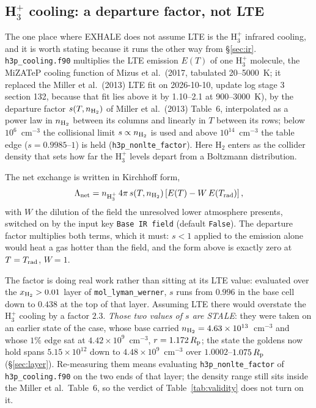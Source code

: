 \documentclass[english,a4paper]{my_memo}
\begin{document}
\subsection{H$_3^+$ cooling: a departure factor, not LTE}
\label{sec:h3p}

The one place where EXHALE does not assume LTE is the H$_3^+$ infrared
cooling, and it is worth stating because it runs the other way from
\S\ref{sec:ir}. \texttt{h3p\_cooling.f90} multiplies the LTE emission
$E(T)$ of one H$_3^+$ molecule, the MiZATeP cooling function of Mizus et al.\
(2017, tabulated 20--5000~K; it replaced the Miller et al.\ (2013) LTE fit on
2026-10-10, update log stage 3 section 132, because that fit lies above it by
1.10--2.1 at 900--3000~K), by the departure factor $s(T, n_{\rm H_2})$ of
Miller et al.\ (2013) Table~6, interpolated as a power law in $n_{\rm H_2}$
between its columns and linearly in $T$ between its rows; below
$10^{6}$~cm$^{-3}$ the collisional limit $s \propto n_{\rm H_2}$ is used and
above $10^{14}$~cm$^{-3}$ the table edge ($s = 0.9985$--$1$) is held
(\texttt{h3p\_nonlte\_factor}). Here
H$_2$ enters as the collider density that sets how far the H$_3^+$ levels
depart from a Boltzmann distribution.

The net exchange is written in Kirchhoff form,
%
\begin{equation}
  \Lambda_{\rm net} = n_{\rm H_3^+}\, 4\pi\, s(T, n_{\rm H_2})
     \left[ E(T) - W\,E(T_{\rm rad}) \right],
\end{equation}
%
with $W$ the dilution of the field the unresolved lower atmosphere presents,
switched on by the input key \texttt{Base IR field} (default \texttt{False}).
The departure factor multiplies both terms, which it must: $s<1$ applied to
the emission alone would heat a gas hotter than the field, and the form above
is exactly zero at $T = T_{\rm rad}$, $W = 1$.

The factor is doing real work rather than sitting at its LTE value: evaluated
over the $x_{\rm H_2} > 0.01$ layer of \texttt{mol\_lyman\_werner}, $s$ runs
from $0.996$ in the base cell down to $0.438$ at the top of that layer.
Assuming LTE there would overstate the H$_3^+$ cooling by a factor $2.3$.
\emph{Those two values of $s$ are STALE}: they were taken on an earlier state
of the case, whose base carried $n_{\rm H_2} = 4.63\times10^{13}$~cm$^{-3}$
and whose $1\%$ edge sat at $4.42\times10^{9}$~cm$^{-3}$, $r = 1.172\,R_{\rm
p}$; the state the goldens now hold spans $5.15\times10^{12}$ down to
$4.48\times10^{9}$~cm$^{-3}$ over $1.0002$--$1.075\,R_{\rm p}$
(\S\ref{sec:layer}). Re-measuring them means evaluating
\texttt{h3p\_nonlte\_factor} of \texttt{h3p\_cooling.f90} on the two ends of that
layer; the density range still sits inside the Miller et al.\ Table~6, so the
verdict of Table~\ref{tab:validity} does not turn on it.
\end{document}
